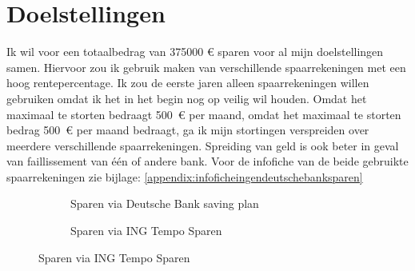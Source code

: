 \newpage
\section{Doelstellingen}




Ik wil voor een totaalbedrag van 375000 \euro{} sparen voor al mijn doelstellingen samen.
Hiervoor zou ik gebruik maken van verschillende spaarrekeningen met een hoog rentepercentage. Ik zou de eerste jaren alleen spaarrekeningen willen gebruiken omdat ik het in het begin nog op veilig wil houden.
Omdat het maximaal te storten bedraagt 500~\euro{} per maand, omdat het maximaal te storten bedrag 500~\euro{} per maand bedraagt, ga ik mijn stortingen verspreiden over meerdere verschillende spaarrekeningen. Spreiding van geld is ook beter in geval van faillissement van één of andere bank.
Voor de infofiche van de beide gebruikte spaarrekeningen zie bijlage: \autoref{appendix:infoficheingendeutschebanksparen}

\begin{comment}
\begin{figure}[!htbp]
  \centering
  \texttt{[image: images/ingtemposparenspaarrekening]}
  \caption{Rentepercentage van 1,20\% gebruikt van ING Tempo Sparen spaarrekening }
  \label{fig:ingtemposparenspaarrekening}
\end{figure}

\begin{figure}[!htbp]
  \centering
  \texttt{[image: images/deutschebankdbsavingplanspaarrekening]}
  \caption{Rentepercentage van 1,50\% gebruikt van ING Tempo Sparen spaarrekening}
  \label{fig:deutschebankdbsavingplanspaarrekening}
\end{figure}
\end{comment}

\begin{figure}
    \centering
    \begin{subfigure}[b]{0.49\textwidth}        
        \caption{Sparen via Deutsche Bank saving plan}
        \label{fig:bedragsparendeutschebank}
    \end{subfigure}
    \begin{subfigure}[b]{0.49\textwidth}
        \caption{Sparen via ING Tempo Sparen}
        \label{fig:bedragspareningbank}
    \end{subfigure}
    \label{fig:tweespaarrekeningenoverzicht}
\end{figure}


